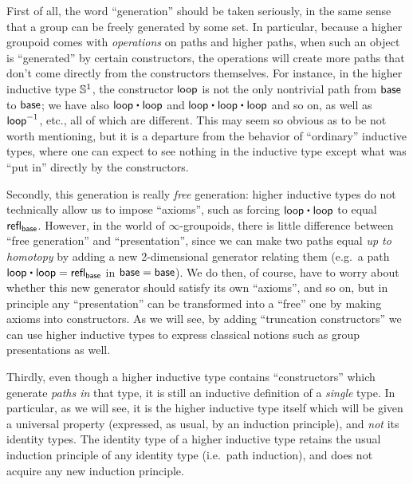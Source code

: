 First of all, the word ``generation'' should be taken seriously, in the same sense that a group can be freely generated by some set.
In particular, because a higher groupoid comes with \emph{operations} on paths and higher paths, when such an object is ``generated'' by certain constructors, the operations will create more paths that don't come directly from the constructors themselves.
For instance, in the higher inductive type $\mathbb{S}^1$, the constructor $\mathsf{loop}$ is not the only nontrivial path from $\mathsf{base}$ to $\mathsf{base}$; we have also $\lloop\ct\lloop$ and $\lloop\ct\lloop\ct\lloop$ and so on, as well as $\mathord{{\mathsf{loop}}^{-1}}$, etc., all of which are different.
This may seem so obvious as to be not worth mentioning, but it is a departure from the behavior of ``ordinary'' inductive types, where one can expect to see nothing in the inductive type except what was ``put in'' directly by the constructors.

Secondly, this generation is really \emph{free} generation: higher inductive types do not technically allow us to impose ``axioms'', such as forcing $\lloop\ct\lloop$ to equal $\mathsf{refl}_{\mathsf{base}}$.
However, in the world of $\infty$-groupoids, there is little difference between ``free generation'' and ``presentation'', since we can make two paths equal \emph{up to homotopy} by adding a new 2-dimensional generator relating them (e.g.\ a path $\lloop\ct\lloop = \refl{\base}$ in $\mathsf{base}=\mathsf{base}$).
We do then, of course, have to worry about whether this new generator should satisfy its own ``axioms'', and so on, but in principle any ``presentation'' can be transformed into a ``free'' one by making axioms into constructors.
As we will see, by adding ``truncation constructors'' we can use higher inductive types to express classical notions such as group presentations as well.

Thirdly, even though a higher inductive type contains ``constructors'' which generate \emph{paths in} that type, it is still an inductive definition of a \emph{single} type.
In particular, as we will see, it is the higher inductive type itself which will be given a universal property (expressed, as usual, by an induction principle), and \emph{not} its identity types.
The identity type of a higher inductive type retains the usual induction principle of any identity type (i.e.\ path induction), and does not acquire any new induction principle.

